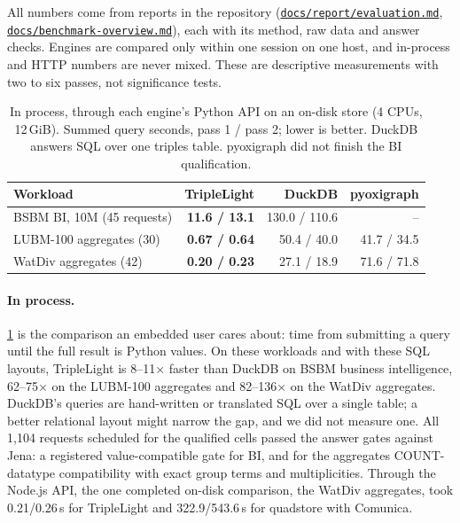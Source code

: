 \documentclass[sigconf,nonacm]{acmart}
\newcommand{\sys}{TripleLight}
\newcommand{\repo}[1]{\href{https://github.com/odysa/triplelight/blob/main/#1}{\nolinkurl{#1}}}
\begin{document}
All numbers come from reports in the repository (\repo{docs/report/evaluation.md},
\repo{docs/benchmark-overview.md}), each with its method, raw data and answer checks. Engines are compared only within
one session on one host, and in-process and HTTP numbers are never mixed. These are descriptive measurements with two
to six passes, not significance tests.

\begin{table}[t]
\caption{In process, through each engine's Python API on an on-disk store (4 CPUs, 12\,GiB). Summed query seconds,
pass 1 / pass 2; lower is better. DuckDB answers SQL over one triples table. pyoxigraph did not finish the BI
qualification.}
\label{tab:python}
\small
\begin{tabular}{@{}lrrr@{}}
\toprule
Workload & \sys{} & DuckDB & pyoxigraph \\
\midrule
BSBM BI, 10M (45 requests) & \textbf{11.6 / 13.1} & 130.0 / 110.6 & -- \\
LUBM-100 aggregates (30) & \textbf{0.67 / 0.64} & 50.4 / 40.0 & 41.7 / 34.5 \\
WatDiv aggregates (42) & \textbf{0.20 / 0.23} & 27.1 / 18.9 & 71.6 / 71.8 \\
\bottomrule
\end{tabular}
\end{table}

\paragraph{In process.} \cref{tab:python} is the comparison an embedded user cares about: time from submitting a query
until the full result is Python values. On these workloads and with these SQL layouts, \sys{} is 8--11$\times$ faster than DuckDB on
BSBM business intelligence, 62--75$\times$ on the LUBM-100 aggregates and 82--136$\times$ on the WatDiv aggregates. DuckDB's queries are hand-written or translated SQL over a
single table; a better relational layout might narrow the gap, and we did not measure one. All 1,104 requests scheduled for
the qualified cells passed the answer gates against Jena: a registered value-compatible gate for BI, and for the
aggregates COUNT-datatype compatibility with exact group terms and multiplicities. Through the Node.js API, the one
completed on-disk comparison, the WatDiv aggregates, took 0.21/0.26\,s for \sys{} and 322.9/543.6\,s for quadstore with
Comunica.
\end{document}
